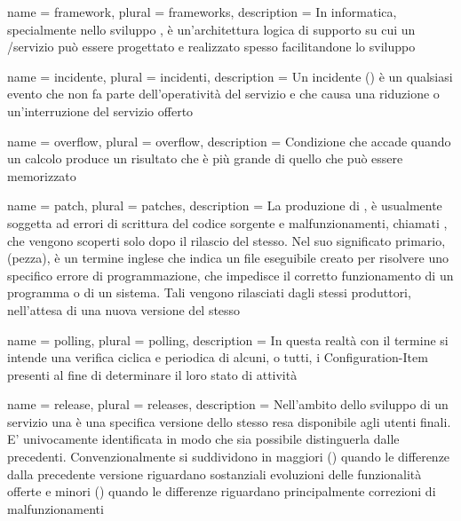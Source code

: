 {
	name		= {framework},
	plural		= {frameworks},
	description = {In informatica, specialmente nello sviluppo , è un'architettura logica di supporto su cui un /servizio può essere progettato e realizzato spesso facilitandone lo sviluppo}
}

{
	name		= {incidente},
	plural		= {incidenti},
	description	= {Un incidente () è un qualsiasi evento che non fa parte dell'operatività  del servizio e che causa una riduzione o un'interruzione del servizio offerto}
}

{
	name		= {overflow},
	plural		= {overflow},
	description = {Condizione che accade quando un calcolo produce un risultato che è più grande di quello che può essere memorizzato}
}

{
	name		= {patch},
	plural		= {patches},
	description = {La produzione di , è usualmente soggetta ad errori di scrittura del codice sorgente e malfunzionamenti, chiamati , che vengono scoperti solo dopo il rilascio del  stesso. Nel suo significato primario,  (pezza), è un termine inglese che indica un file eseguibile creato per risolvere uno specifico errore di programmazione, che impedisce il corretto funzionamento di un programma o di un sistema. Tali  vengono rilasciati dagli stessi produttori, nell'attesa di una nuova versione del  stesso}
}

{
	name		= {polling},
	plural		= {polling},
	description = {In questa realtà con il termine  si intende una verifica ciclica e periodica di alcuni, o tutti, i \ac{Configuration-Item} presenti al fine di determinare il loro stato di attività}
}

{
	name		= {release},
	plural		= {releases},
	description = {Nell'ambito dello sviluppo di un servizio una  è una specifica versione dello stesso resa disponibile agli utenti finali. E' univocamente identificata in modo che sia possibile distinguerla dalle precedenti. Convenzionalmente si suddividono in  maggiori () quando le differenze dalla precedente versione riguardano sostanziali evoluzioni delle funzionalità offerte e  minori () quando le differenze riguardano principalmente correzioni di malfunzionamenti}
}

